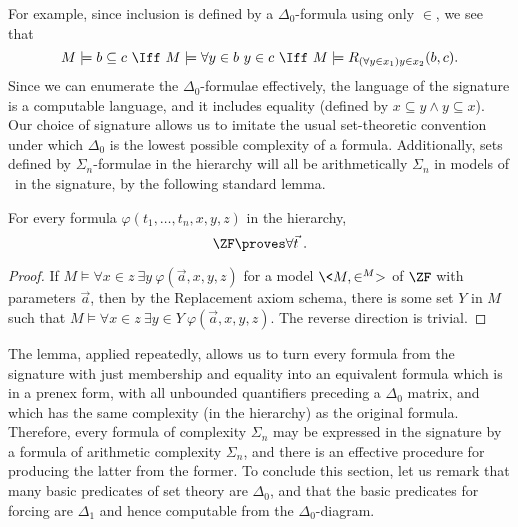 \documentclass{amsart}
\begin{document}
For example, since inclusion is defined by a $\Delta_0$-formula using only $\in$, we see that
$$ M\models b\subseteq c \ \Iff \ M\models \forall y\in b\ y\in c
\ \Iff \ M\models R_{(\forall y\in x_1)y\in x_2}(b,c).$$
Since we can enumerate the $\Delta_0$-formulae effectively, the language of the \Levy{} signature is a computable language, and it includes equality (defined by $x\subseteq y \land y\subseteq x$).
Our choice of signature allows us to imitate the usual set-theoretic convention under which $\Delta_0$ is the lowest possible complexity of a formula.
Additionally, sets defined by $\Sigma_n$-formulae in the \Levy{} hierarchy will all be arithmetically $\Sigma_n$
in models of \ZF\ in the \Levy{} signature, by the following standard lemma.
\begin{lemma}
\label{lemma.Levy.signature}
For every formula $\varphi(t_1,\ldots,t_n,x,y,z)$ in the \Levy{} hierarchy,
$$ \ZF \proves \forall\vec t\ .$$
\end{lemma}
\begin{proof}
If $M \models \forall x\in z\ \exists y\ \varphi(\vec a,x,y,z)$ for a model $\<M,\in^M>$ of $\ZF$ with parameters $\vec a$, then by the Replacement axiom schema, there is some set $Y$ in $M$ such that $M \models \forall x\in z\ \exists y\in Y\ \varphi(\vec a,x,y,z)$.
The reverse direction is trivial.
\end{proof}
The lemma, applied repeatedly, allows us to turn every formula from the signature with just membership and equality into an equivalent formula which is in a prenex form, with all unbounded quantifiers preceding a $\Delta_0$ matrix, and which has the same complexity (in the \Levy{} hierarchy) as the original formula. Therefore, every formula of \Levy{} complexity $\Sigma_n$ may be expressed in the \Levy{} signature by a formula of arithmetic complexity $\Sigma_n$, and there is an effective procedure for producing the latter from the former.
To conclude this section, let us remark that many basic predicates of set theory are $\Delta_0$, and that the basic predicates for forcing are $\Delta_1$ and hence computable from the $\Delta_0$-diagram.
\end{document}
